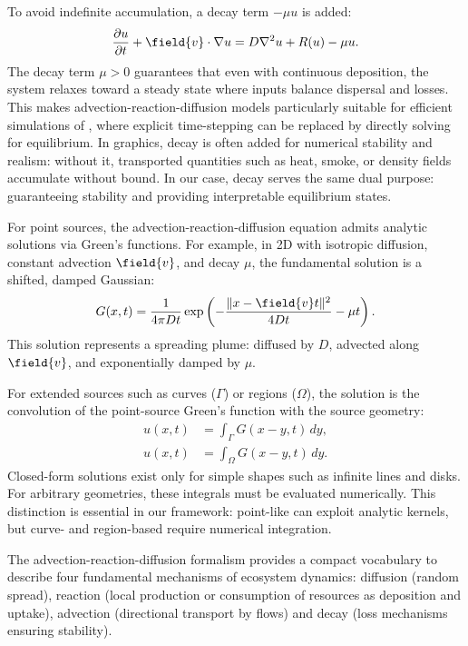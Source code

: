 To avoid indefinite accumulation, a decay term $-\mu u$ is added:
\begin{align}
    \label{eq:reaction-diffusion-advection-decay}
    \frac{\partial u}{\partial t} + \field{v}\cdot \nabla u = D \nabla^2 u + R(u) - \mu u.
\end{align}
The decay term $\mu > 0$ guarantees that even with continuous deposition, the system relaxes toward a steady state where inputs balance dispersal and losses. This makes advection-reaction-diffusion models particularly suitable for efficient simulations of , where explicit time-stepping can be replaced by directly solving for equilibrium.  
In graphics, decay is often added for numerical stability and realism: without it, transported quantities such as heat, smoke, or density fields accumulate without bound. In our case, decay serves the same dual purpose: guaranteeing stability and providing interpretable equilibrium states.

For point sources, the advection-reaction-diffusion equation admits analytic solutions via Green's functions. For example, in 2D with isotropic diffusion, constant advection $\field{v}$, and decay $\mu$, the fundamental solution is a shifted, damped Gaussian:
\begin{align}
    G(x,t) = \frac{1}{4\pi D t} \exp \left( -\frac{\|x - \field{v}t\|^2}{4Dt} - \mu t \right).
\end{align}
This solution represents a spreading plume: diffused by $D$, advected along $\field{v}$, and exponentially damped by $\mu$.  

For extended sources such as curves ($\Gamma$) or regions ($\Omega$), the solution is the convolution of the point-source Green's function with the source geometry:
\begin{align}
    u(x,t) &= \int_\Gamma G(x-y,t)\,dy, \\
    u(x,t) &= \int_\Omega G(x-y,t)\,dy.
\end{align}
Closed-form solutions exist only for simple shapes such as infinite lines and disks. For arbitrary geometries, these integrals must be evaluated numerically.  
This distinction is essential in our framework: point-like  can exploit analytic kernels, but curve- and region-based  require numerical integration.

\midConclusion 
The advection-reaction-diffusion formalism provides a compact vocabulary to describe four fundamental mechanisms of ecosystem dynamics: diffusion (random spread), reaction (local production or consumption of resources as  deposition and uptake), advection (directional transport by flows) and decay (loss mechanisms ensuring stability).

